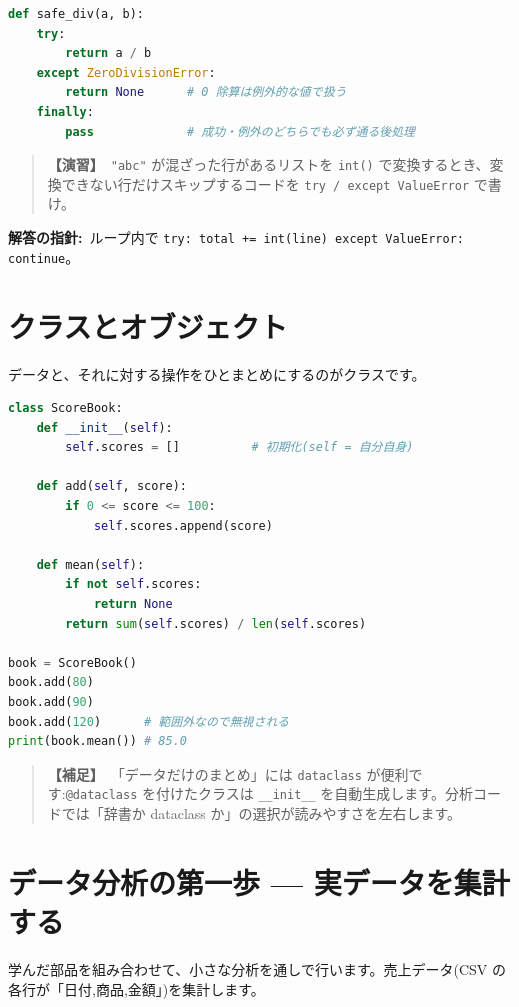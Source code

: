 \documentclass{article}
\begin{document}
\begin{lstlisting}[language=Python]
def safe_div(a, b):
    try:
        return a / b
    except ZeroDivisionError:
        return None      # 0 除算は例外的な値で扱う
    finally:
        pass             # 成功・例外のどちらでも必ず通る後処理
\end{lstlisting}

\begin{quote}
\textbf{【演習】}\ \texttt{"abc"} が混ざった行があるリストを \texttt{int()} で変換するとき、変換できない行だけスキップするコードを \texttt{try / except ValueError} で書け。
\end{quote}

\textbf{解答の指針:}\ ループ内で \texttt{try: total += int(line) except ValueError: continue}。

\section{クラスとオブジェクト}

データと、それに対する操作をひとまとめにするのがクラスです。

\begin{lstlisting}[language=Python]
class ScoreBook:
    def __init__(self):
        self.scores = []          # 初期化(self = 自分自身)

    def add(self, score):
        if 0 <= score <= 100:
            self.scores.append(score)

    def mean(self):
        if not self.scores:
            return None
        return sum(self.scores) / len(self.scores)

book = ScoreBook()
book.add(80)
book.add(90)
book.add(120)      # 範囲外なので無視される
print(book.mean()) # 85.0
\end{lstlisting}

\begin{quote}
\textbf{【補足】}\ 「データだけのまとめ」には \texttt{dataclass} が便利です:\texttt{@dataclass} を付けたクラスは \texttt{\_\_init\_\_} を自動生成します。分析コードでは「辞書か dataclass か」の選択が読みやすさを左右します。
\end{quote}

\section{データ分析の第一歩 — 実データを集計する}

学んだ部品を組み合わせて、小さな分析を通しで行います。売上データ(CSV の各行が「日付,商品,金額」)を集計します。
\end{document}
